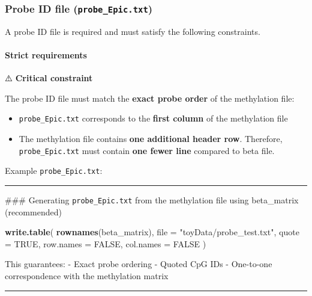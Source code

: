 \documentclass[
]{article}
\newenvironment{Shaded}{\begin{snugshade}}{\end{snugshade}}
\newcommand{\AttributeTok}[1]{\textcolor[rgb]{0.13,0.29,0.53}{#1}}
\newcommand{\ConstantTok}[1]{\textcolor[rgb]{0.56,0.35,0.01}{#1}}
\newcommand{\FunctionTok}[1]{\textcolor[rgb]{0.13,0.29,0.53}{\textbf{#1}}}
\newcommand{\NormalTok}[1]{#1}
\newcommand{\StringTok}[1]{\textcolor[rgb]{0.31,0.60,0.02}{#1}}
\providecommand{\tightlist}{%
  \setlength{\itemsep}{0pt}\setlength{\parskip}{0pt}}
\begin{document}
\subsubsection{\texorpdfstring{Probe ID file
(\texttt{probe\_Epic.txt})}{Probe ID file (probe\_Epic.txt)}}\label{probe-id-file-probe_epic.txt}

A probe ID file is required and must satisfy the following constraints.

\paragraph{Strict requirements}\label{strict-requirements}

⚠️ \textbf{Critical constraint}

The probe ID file must match the \textbf{exact probe order} of the
methylation file:

\begin{itemize}
\tightlist
\item
  \texttt{probe\_Epic.txt} corresponds to the \textbf{first column} of
  the methylation file
\item
  The methylation file contains \textbf{one additional header row}.
  Therefore, \texttt{probe\_Epic.txt} must contain \textbf{one fewer
  line} compared to beta file.
\end{itemize}

Example \texttt{probe\_Epic.txt}:

\begin{center}\rule{0.5\linewidth}{0.5pt}\end{center}

\#\#\# Generating \texttt{probe\_Epic.txt} from the methylation file
using beta\_matrix (recommended)

\begin{Shaded}
\begin{Highlighting}[]
\FunctionTok{write.table}\NormalTok{(}
\FunctionTok{rownames}\NormalTok{(beta\_matrix),}
\AttributeTok{file =} \StringTok{"toyData/probe\_test.txt"}\NormalTok{,}
\AttributeTok{quote =} \ConstantTok{TRUE}\NormalTok{,}
\AttributeTok{row.names =} \ConstantTok{FALSE}\NormalTok{,}
\AttributeTok{col.names =} \ConstantTok{FALSE}
\NormalTok{)}
\end{Highlighting}
\end{Shaded}

This guarantees: - Exact probe ordering - Quoted CpG IDs - One-to-one
correspondence with the methylation matrix

\begin{center}\rule{0.5\linewidth}{0.5pt}\end{center}
\end{document}
